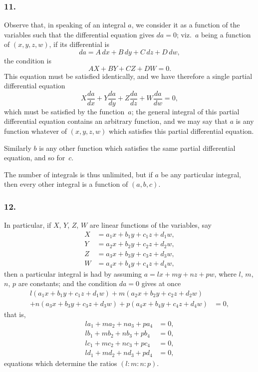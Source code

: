 \documentclass[12pt,a4paper]{article}
\theoremstyle{plain}
\begin{document}
\subsubsection*{11.}

Observe that, in speaking of an integral $a$, we consider it as a function of the variables such that the differential equation gives $da = 0$; viz.~$a$ being a function of $(x, y, z, w)$, if its differential is
\[
da = A\,dx + B\,dy + C\,dz + D\,dw,
\]
the condition is
\[
AX + BY + CZ + DW = 0.
\]
This equation must be satisfied identically, and we have therefore a single partial differential equation
\[
X\frac{da}{dx} + Y\frac{da}{dy} + Z\frac{da}{dz} + W\frac{da}{dw} = 0,
\]
which must be satisfied by the function~$a$; the general integral of this partial differential equation contains an arbitrary function, and we may say that $a$ is any function whatever of $(x, y, z, w)$ which satisfies this partial differential equation.

Similarly $b$ is any other function which satisfies the same partial differential equation, and so for~$c$.

The number of integrals is thus unlimited, but if $a$ be any particular integral, then every other integral is a function of $(a, b, c)$.

\subsubsection*{12.}

In particular, if $X$, $Y$, $Z$, $W$ are linear functions of the variables, say
\begin{align*}
X &= a_{1}x + b_{1}y + c_{1}z + d_{1}w, \\
Y &= a_{2}x + b_{2}y + c_{2}z + d_{2}w, \\
Z &= a_{3}x + b_{3}y + c_{3}z + d_{3}w, \\
W &= a_{4}x + b_{4}y + c_{4}z + d_{4}w,
\end{align*}
then a particular integral is had by assuming $a = lx + my + nz + pw$, where $l$, $m$, $n$, $p$ are constants; and the condition $da = 0$ gives at once
\begin{align*}
l(a_{1}x + b_{1}y + c_{1}z + d_{1}w) + m(a_{2}x + b_{2}y + c_{2}z + d_{2}w) \\
+ n(a_{3}x + b_{3}y + c_{3}z + d_{3}w) + p(a_{4}x + b_{4}y + c_{4}z + d_{4}w) &= 0,
\end{align*}
that is,
\begin{align*}
l a_{1} + m a_{2} + n a_{3} + p a_{4} &= 0, \\
l b_{1} + m b_{2} + n b_{3} + p b_{4} &= 0, \\
l c_{1} + m c_{2} + n c_{3} + p c_{4} &= 0, \\
l d_{1} + m d_{2} + n d_{3} + p d_{4} &= 0,
\end{align*}
equations which determine the ratios $(l : m : n : p)$.
\end{document}
